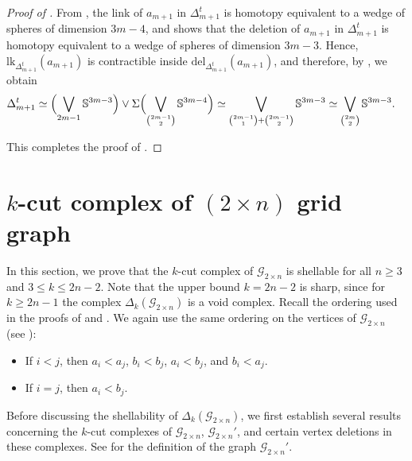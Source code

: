 \documentclass[11pt,reqno,a4paper]{amsart}
\theoremstyle{definition}
\theoremstyle{theorem}
\newcommand{\kcut}{\Delta_{k}}
\newcommand{\twogg}{\mathcal{G}_{2\times n}}
\newcommand{\twoggp}{\mathcal{G}_{2\times n}'}
\newcommand{\lno}{\left(}
\newcommand{\rno}{\right)}
\newcommand{\bbS}{\mathbb{S}}
\newcommand{\lk}{\mathrm{lk}}
\newcommand{\del}{\mathrm{del}}
\theoremstyle{remark}
\begin{document}
\begin{proof}[Proof of ]
From , the link of $a_{m+1}$ in $\Delta_{m+1}^t$ is homotopy equivalent to a wedge of spheres of dimension $3m-4$, and  shows that the deletion of $a_{m+1}$ in $\Delta_{m+1}^t$ is homotopy equivalent to a wedge of spheres of dimension $3m-3$. Hence, $\lk_{\Delta_{m+1}^t}\lno a_{m+1} \rno$ is contractible inside $\del_{\Delta_{m+1}^t}\lno a_{m+1} \rno$, and therefore, by , we obtain
\begin{align*}
    \Delta_{m+1}^t
        &\simeq 
        \Bigl( \bigvee\limits_{2m-1} \bbS^{3m-3} \Bigr)
        \vee
        \Sigma \Bigl( \bigvee\limits_{\binom{2m-1}{2}} \bbS^{3m-4} \Bigr) \simeq 
        \bigvee\limits_{\binom{2m-1}{1} + \binom{2m-1}{2}}
            \bbS^{3m-3} \simeq 
        \bigvee\limits_{\binom{2m}{2}}
            \bbS^{3m-3}.
\end{align*}

This completes the proof of .
\end{proof}


\section{$k$-cut complex of $\left( 2 \times n \right) $ grid graph}\label{section: shellability of k-cut of 2n-gg}

In this section, we prove that the $k$-cut complex of $\twogg$ is shellable for all $n \geq 3$ and $3 \leq k \leq 2n-2$. Note that the upper bound $k = 2n-2$ is sharp, since for $k \geq 2n-1$ the complex $\kcut\lno \twogg \rno$ is a void complex. Recall the ordering used in the proofs of  and . We again use the same ordering on the vertices of $\twogg$ (see ):
\begin{itemize}
    \item If $i < j$, then $a_i < a_j$, $b_i < b_j$, $a_i < b_j$, and $b_i < a_j$.
    \item If $i = j$, then $a_i < b_j$.
\end{itemize}

Before discussing the shellability of $\kcut \lno \twogg \rno$, we first establish several results concerning the $k$-cut complexes of $\twogg$, $\twoggp$, and certain vertex deletions in these complexes. See  for the definition of the graph $\twoggp$.
\end{document}
